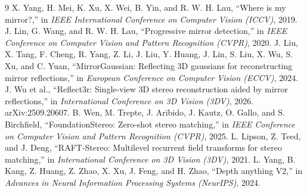 \documentclass[twocolumn,10pt,a4paper]{article}
\begin{document}
\begin{thebibliography}{9}
\small
{} X. Yang, H. Mei, K. Xu, X. Wei, B. Yin, and R. W. H. Lau, ``Where is my mirror?,'' in \emph{IEEE International Conference on Computer Vision (ICCV)}, 2019.
 J. Lin, G. Wang, and R. W. H. Lau, ``Progressive mirror detection,'' in \emph{IEEE Conference on Computer Vision and Pattern Recognition (CVPR)}, 2020.
 J. Liu, X. Tang, F. Cheng, R. Yang, Z. Li, J. Liu, Y. Huang, J. Lin, S. Liu, X. Wu, S. Xu, and C. Yuan, ``MirrorGaussian: Reflecting 3D gaussians for reconstructing mirror reflections,'' in \emph{European Conference on Computer Vision (ECCV)}, 2024.
 J. Wu et al., ``Reflect3r: Single-view 3D stereo reconstruction aided by mirror reflections,'' in \emph{International Conference on 3D Vision (3DV)}, 2026. arXiv:2509.20607.
 B. Wen, M. Trepte, J. Aribido, J. Kautz, O. Gallo, and S. Birchfield, ``FoundationStereo: Zero-shot stereo matching,'' in \emph{IEEE Conference on Computer Vision and Pattern Recognition (CVPR)}, 2025.
 L. Lipson, Z. Teed, and J. Deng, ``RAFT-Stereo: Multilevel recurrent field transforms for stereo matching,'' in \emph{International Conference on 3D Vision (3DV)}, 2021.
 L. Yang, B. Kang, Z. Huang, Z. Zhao, X. Xu, J. Feng, and H. Zhao, ``Depth anything V2,'' in \emph{Advances in Neural Information Processing Systems (NeurIPS)}, 2024.
\end{thebibliography}
\end{document}
